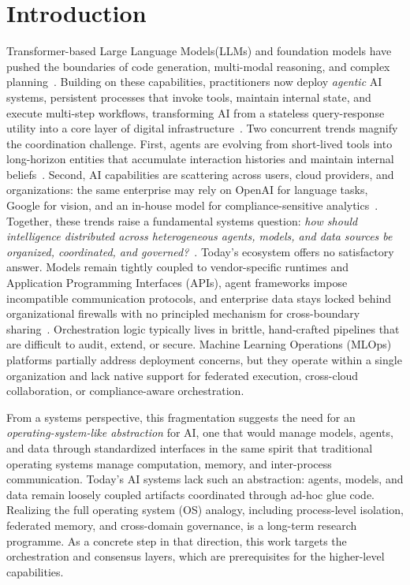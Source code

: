 \documentclass{iopjournal}
\begin{document}
\section{Introduction}\label{sec:intro}
Transformer-based Large Language Models(LLMs) and foundation models have pushed the boundaries of code generation, multi-modal reasoning, and complex planning~\cite{Kotei, chen2024evolution}. Building on these capabilities, practitioners now deploy \emph{agentic} AI systems, persistent processes that invoke tools, maintain internal state, and execute multi-step workflows, transforming AI from a stateless query-response utility into a core layer of digital infrastructure~\cite{Meleka}. Two concurrent trends magnify the coordination challenge. First, agents are evolving from short-lived tools into long-horizon entities that accumulate interaction histories and maintain internal beliefs~\cite{Liu}. Second, AI capabilities are scattering across users, cloud providers, and organizations: the same enterprise may rely on OpenAI for language tasks, Google for vision, and an in-house model for compliance-sensitive analytics~\cite{Davenport}. Together, these trends raise a fundamental systems question: \emph{how should intelligence distributed across heterogeneous agents, models, and data sources be organized, coordinated, and governed?}~\cite{zhu2023intelligent}. Today's ecosystem offers no satisfactory answer. Models remain tightly coupled to vendor-specific runtimes and Application Programming Interfaces (APIs), agent frameworks impose incompatible communication protocols, and enterprise data stays locked behind organizational firewalls with no principled mechanism for cross-boundary sharing~\cite{guu2020retrieval}. Orchestration logic typically lives in brittle, hand-crafted pipelines that are difficult to audit, extend, or secure. Machine Learning Operations (MLOps) platforms partially address deployment concerns, but they operate within a single organization and lack native support for federated execution, cross-cloud collaboration, or compliance-aware orchestration.

From a systems perspective, this fragmentation suggests the need for an \emph{operating-system-like abstraction} for AI, one that would manage models, agents, and data through standardized interfaces in the same spirit that traditional operating systems manage computation, memory, and inter-process communication. Today's AI systems lack such an abstraction: agents, models, and data remain loosely coupled artifacts coordinated through ad-hoc glue code. Realizing the full operating system (OS) analogy, including process-level isolation, federated memory, and cross-domain governance, is a long-term research programme. As a concrete step in that direction, this work targets the orchestration and consensus layers, which are prerequisites for the higher-level capabilities.
\end{document}
